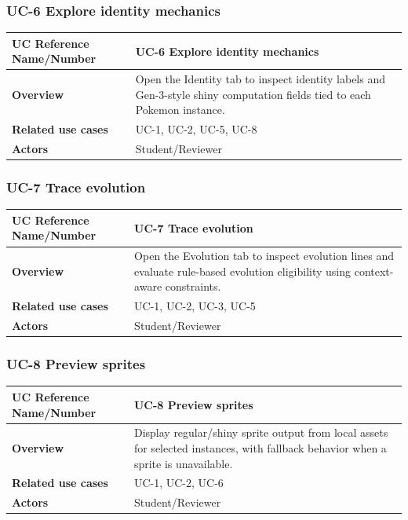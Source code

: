 \documentclass[12pt]{article}
\begin{document}
\subsubsection*{UC-6 Explore identity mechanics}
\begin{tabular}{|p{}|p{}|}
\hline
\textbf{UC Reference Name/Number} & \textbf{UC-6 Explore identity mechanics} \\
\hline
\textbf{Overview} & Open the Identity tab to inspect identity labels and
Gen-3-style shiny computation fields tied to each Pokemon instance. \\
\hline
\textbf{Related use cases} & UC-1, UC-2, UC-5, UC-8 \\
\hline
\textbf{Actors} & Student/Reviewer \\
\hline
\end{tabular}

\subsubsection*{UC-7 Trace evolution}
\begin{tabular}{|p{}|p{}|}
\hline
\textbf{UC Reference Name/Number} & \textbf{UC-7 Trace evolution} \\
\hline
\textbf{Overview} & Open the Evolution tab to inspect evolution lines and
evaluate rule-based evolution eligibility using context-aware constraints. \\
\hline
\textbf{Related use cases} & UC-1, UC-2, UC-3, UC-5 \\
\hline
\textbf{Actors} & Student/Reviewer \\
\hline
\end{tabular}

\subsubsection*{UC-8 Preview sprites}
\begin{tabular}{|p{}|p{}|}
\hline
\textbf{UC Reference Name/Number} & \textbf{UC-8 Preview sprites} \\
\hline
\textbf{Overview} & Display regular/shiny sprite output from local assets for
selected instances, with fallback behavior when a sprite is unavailable. \\
\hline
\textbf{Related use cases} & UC-1, UC-2, UC-6 \\
\hline
\textbf{Actors} & Student/Reviewer \\
\hline
\end{tabular}
\end{document}

